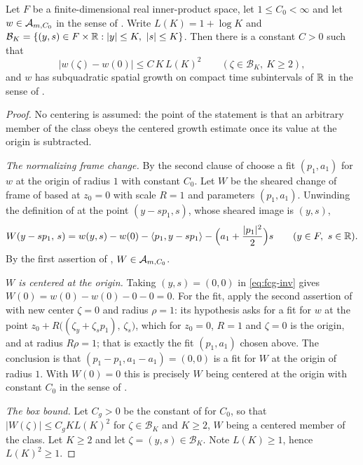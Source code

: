 \begin{helper}
Let $F$ be a finite-dimensional real inner-product space, let $1\le C_0<\infty$
and let $w\in\mathcal{A}_{m,C_0}$ in the sense of . Write
$L(K)=1+\log K$ and
$\mathcal B_K=\{(y,s)\in F\times\mathbb{R}:|y|\le K,\ |s|\le K\}$. Then there is a
constant $C>0$ such that
\[
  \bigl|w(\zeta)-w(0)\bigr|\le C\,K\,L(K)^2
  \qquad(\zeta\in\mathcal B_K,\ K\ge2),
\]
and $w$ has subquadratic spatial growth on compact time subintervals of $\mathbb{R}$ in
the sense of .
\end{helper}
\begin{proof}
No centering is assumed: the point of the statement is that an arbitrary member
of the class obeys the centered growth estimate once its value at the origin is
subtracted.

\emph{The normalizing frame change.} By the second clause of
 choose a fit $(p_1,a_1)$ for $w$ at the origin of radius
$1$ with constant $C_0$. Let $W$ be the sheared change of frame of
 based at $z_0=0$ with scale $R=1$ and parameters
$(p_1,a_1)$. Unwinding the definition of  at the point
$(y-s p_1,s)$, whose sheared image is $(y,s)$,
\begin{equation}\label{eq:fcg-inv}
  W(y-sp_1,\,s)=w(y,s)-w(0)-\langle p_1,y-sp_1\rangle
     -\Bigl(a_1+\frac{|p_1|^2}{2}\Bigr)s
  \qquad(y\in F,\ s\in\mathbb{R}).
\end{equation}
By the first assertion of , $W\in\mathcal{A}_{m,C_0}$.

\emph{$W$ is centered at the origin.} Taking $(y,s)=(0,0)$ in
\eqref{eq:fcg-inv} gives $W(0)=w(0)-w(0)-0-0=0$. For the fit, apply the second
assertion of  with new center $\zeta=0$ and radius
$\rho=1$: its hypothesis asks for a fit for $w$ at the point
$z_0+R\bigl((\zeta_y+\zeta_s p_1),\,\zeta_s\bigr)$, which for $z_0=0$, $R=1$ and
$\zeta=0$ is the origin, and at radius $R\rho=1$; that is exactly the fit
$(p_1,a_1)$ chosen above. The conclusion is that $(p_1-p_1,a_1-a_1)=(0,0)$ is a
fit for $W$ at the origin of radius $1$. With $W(0)=0$ this is precisely
$W$ being centered at the origin with constant $C_0$ in the sense of
.

\emph{The box bound.} Let $C_g>0$ be the constant of 
for $C_0$, so that $|W(\zeta)|\le C_gKL(K)^2$ for $\zeta\in\mathcal B_K$ and
$K\ge2$, $W$ being a centered member of the class. Let $K\ge2$ and let
$\zeta=(y,s)\in\mathcal B_K$. Note $L(K)\ge1$, hence $L(K)^2\ge1$.


\end{proof}
